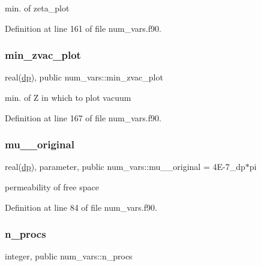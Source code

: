 min. of {\ttfamily zeta\+\_\+plot} 



Definition at line 161 of file num\+\_\+vars.\+f90.

\mbox{\label{namespacenum__vars_ab9fd7d4e9921ff8ceab88317f0c1ae5f}} 
\subsubsection{\texorpdfstring{min\+\_\+zvac\+\_\+plot}{min\_zvac\_plot}}
{\footnotesize\ttfamily real(\hyperlink{namespacenum__vars_a03802aa2bd86439d7a9370836fabf3f2}{dp}), public num\+\_\+vars\+::min\+\_\+zvac\+\_\+plot}



min. of {\ttfamily Z} in which to plot vacuum 



Definition at line 167 of file num\+\_\+vars.\+f90.

\mbox{\label{namespacenum__vars_a50e309ca1a5833d2838ed7457b7eb686}} 
\subsubsection{\texorpdfstring{mu\+\_\+\_\+original}{mu\_0\_original}}
{\footnotesize\ttfamily real(\hyperlink{namespacenum__vars_a03802aa2bd86439d7a9370836fabf3f2}{dp}), parameter, public num\+\_\+vars\+::mu\+\_\+\_\+original = 4\+E-\/7\+\_\+dp$\ast$pi}



permeability of free space 



Definition at line 84 of file num\+\_\+vars.\+f90.

\mbox{\label{namespacenum__vars_a3a1f41c66c3d91fc749bcffd177b0662}} 
\subsubsection{\texorpdfstring{n\+\_\+procs}{n\_procs}}
{\footnotesize\ttfamily integer, public num\+\_\+vars\+::n\+\_\+procs}



